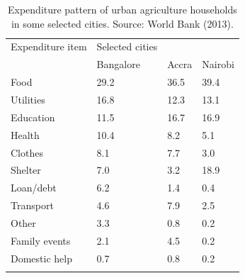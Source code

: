 \begin{table}[th]
\caption{Expenditure pattern of urban agriculture households in some selected cities. Source: World Bank (2013).}
\begin{center}
\begin{tabular}{ p{} p{} p{} p{} } 
\hline
Expenditure item & Selected cities &  &  \\
  & Bangalore & Accra & Nairobi \\
\hline
Food & 29.2 & 36.5 & 39.4 \\
Utilities & 16.8 & 12.3 & 13.1 \\
Education & 11.5 & 16.7 & 16.9 \\
Health & 10.4 & 8.2 & 5.1 \\
Clothes & 8.1 & 7.7 & 3.0 \\
Shelter & 7.0 & 3.2 & 18.9 \\
Loan/debt & 6.2 & 1.4 & 0.4 \\
Transport & 4.6 & 7.9 & 2.5 \\
Other & 3.3 & 0.8 & 0.2 \\
Family events & 2.1 & 4.5 & 0.2 \\
Domestic help & 0.7 & 0.8 & 0.2 \\
\hline
\label{tbl:expenditurePattern}
\end{tabular}
\end{center}
\end{table}

